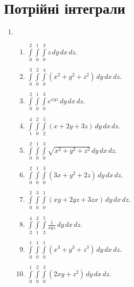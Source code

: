 \section{Потрійні інтеграли}
\begin{enumerate}
 \item
        \begin{enumerate}[label*=\arabic*.]
            \item $\int\limits_0^2\int\limits_0^1\int\limits_0^3 z \,dy\,dx\,dz$.
            \item $\int\limits_0^3\int\limits_0^2\int\limits_0^4 (x^2 + y^2 + z^2) \,dy\,dx\,dz$.
            \item $\int\limits_0^2\int\limits_0^1\int\limits_0^3 e^{xyz} \,dy\,dx\,dz$.
            \item $\int\limits_1^4\int\limits_0^2\int\limits_2^5 (x + 2y + 3z) \,dy\,dx\,dz$.
            \item $\int\limits_0^2\int\limits_0^1\int\limits_0^3 \sqrt{x^2 + y^2 + z^2} \,dy\,dx\,dz$.
            \item $\int\limits_0^2\int\limits_0^1\int\limits_0^3 (3x + y^2 + 2z) \,dy\,dx\,dz$.
            \item $\int\limits_0^2\int\limits_0^3\int\limits_0^1 (xy + 2yz + 3zx) \,dy\,dx\,dz$.
            \item $\int\limits_2^4\int\limits_1^2\int\limits_3^5 \frac{1}{xyz} \,dy\,dx\,dz$.
            \item $\int\limits_0^1\int\limits_0^1\int\limits_0^1 (x^3 + y^3 + z^3) \,dy\,dx\,dz$.
            \item $\int\limits_0^1\int\limits_0^2\int\limits_0^3 (2xy + z^2) \,dy\,dx\,dz$.
        \end{enumerate}
\end{enumerate}
